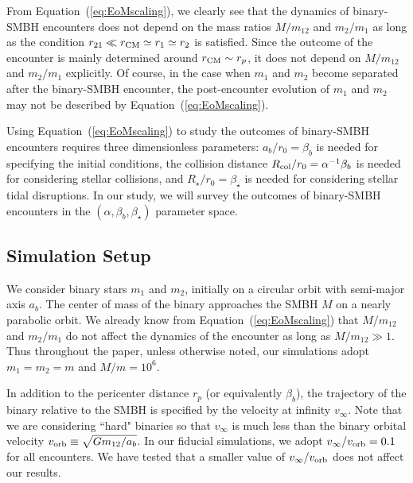 \documentclass[twocolumn]{aastex631}
\begin{document}
From Equation~(\ref{eq:EoMscaling}), we clearly see that the dynamics of binary-SMBH encounters does not depend on the mass ratios $M/m_{12}$ and $m_2/m_1$ as long as the condition $r_{21} \ll r_{\rm CM}\simeq r_1 \simeq r_2$ is satisfied.
Since the outcome of the encounter is mainly determined around $r_{\rm CM} \sim r_p$, it does not depend on $M/m_{12}$ and $m_2/m_1$ explicitly.
Of course, in the case when $m_1$ and $m_2$ become separated after the binary-SMBH encounter, the post-encounter evolution of $m_1$ and $m_2$ may not be described by Equation~(\ref{eq:EoMscaling}).

Using Equation~(\ref{eq:EoMscaling}) to study the outcomes of binary-SMBH encounters requires three dimensionless parameters: 
$a_b/r_0=\beta_b$ is needed for specifying the initial conditions, the collision distance $R_{\rm col}/r_0=\alpha^{-1}\beta_b$ is needed for considering stellar collisions, and $R_\star/r_0=\beta_\star$ is needed for considering stellar tidal disruptions. 
In our study, we will survey the outcomes of binary-SMBH encounters in the $(\alpha, \beta_b, \beta_\star)$ parameter space.


\subsection{Simulation Setup}
\label{sec:setup}

We consider binary stars $m_1$ and $m_2$, initially on a circular orbit with semi-major axis $a_b$. 
The center of mass of the binary approaches the SMBH $M$ on a nearly parabolic orbit.
We already know from Equation~(\ref{eq:EoMscaling}) that $M/m_{12}$ and $m_2/m_1$ do not affect the dynamics of the encounter as long as $M/m_{12}\gg 1$.
Thus throughout the paper, unless otherwise noted, our simulations adopt $m_1=m_2=m$ and $M/m = 10^6$. 

In addition to the pericenter distance $r_p$ (or equivalently $\beta_b$), the trajectory of the binary relative to the SMBH is specified by the velocity at infinity $v_\infty$.
Note that we are considering ``hard" binaries so that $v_\infty$ is much less than the binary orbital velocity $v_{\rm orb}\equiv\sqrt{Gm_{12}/a_b}$.
In our fiducial simulations, we adopt $v_\infty/v_{\rm orb}=0.1$ for all encounters. 
We have tested that a smaller value of $v_\infty/v_{\rm orb}$ does not affect our results.
\end{document}
